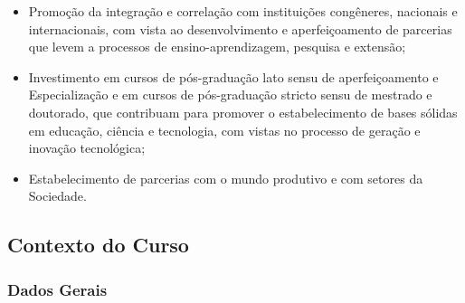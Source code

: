\begin{itemize}
  \item Promoção da integração e correlação com instituições congêneres, nacionais e internacionais, com vista ao desenvolvimento e aperfeiçoamento de parcerias que levem a processos de ensino-aprendizagem, pesquisa e extensão;
  \item Investimento em cursos de pós-graduação lato sensu de aperfeiçoamento e Especialização e em cursos de pós-graduação stricto sensu de mestrado e doutorado, que contribuam para promover o estabelecimento de bases sólidas em educação, ciência e tecnologia, com vistas no processo de geração e inovação tecnológica;
  \item Estabelecimento de parcerias com o mundo produtivo e com setores da Sociedade.
\end{itemize}

\subsection{Contexto do Curso}

\subsubsection{Dados Gerais}

